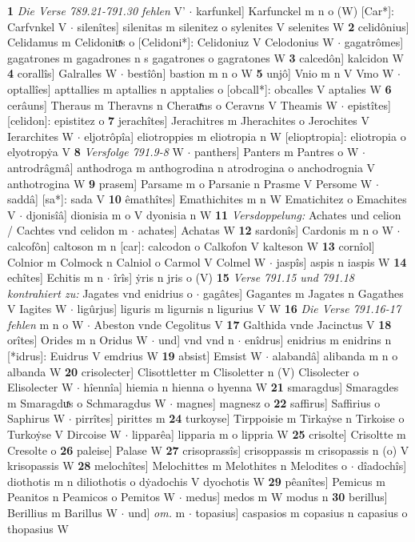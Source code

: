 \documentclass[8pt,a4paper,notitlepage]{article}
\begin{document}
\begin{table}[ht]
\begin{minipage}[t]{0.5\linewidth}
\textbf{1} \textit{Die Verse 789.21-791.30 fehlen} V'   $\cdot$ karfunkel] Karfunckel m n o (W) [Car*]: Carfvnkel  V  $\cdot$ silenîtes] silenitas m silenitez o sylenites V selenites W \textbf{2} celidônius] Celidamus m Celidoniuͯs o [Celidoni*]: Celidoniuz V Celodonius W  $\cdot$ gagatrômes] gagatrones m gagadrones n s gagatrones o gagratones W \textbf{3} calcedôn] kalcidon W \textbf{4} corallîs] Galralles W  $\cdot$ bestîôn] bastion m n o W \textbf{5} unjô] Vnio m n V Vmo W  $\cdot$ optallîes] apttallies m aptallies n apptalies o [obcall*]: obcalles V aptalies W \textbf{6} cerâuns] Theraus m Theravns n Cherauͯns o Ceravns V Theamis W  $\cdot$ epistîtes] [celidon]: epistitez o \textbf{7} jerachîtes] Jerachitres m Jherachites o Jerochites V Ierarchites W  $\cdot$ eljotrôpîa] eliotroppies m eliotropia n W [elioptropia]: eliotropia o elyotropẏa V \textbf{8} \textit{Versfolge 791.9-8} W   $\cdot$ panthers] Panters m Pantres o W  $\cdot$ antrodrâgmâ] anthodroga m anthogrodina n atrodrogina o anchodrognia V anthotrogina W \textbf{9} prasem] Parsame m o Parsanie n Prasme V Persome W  $\cdot$ saddâ] [sa*]: sada V \textbf{10} êmathîtes] Emathichites m n W Ematichitez o Emachites V  $\cdot$ djonisîâ] dionisia m o V dyonisia n W \textbf{11} \textit{Versdoppelung:} Achates und celion / Cachtes vnd celidon m   $\cdot$ achates] Achatas W \textbf{12} sardonîs] Cardonis m n o W  $\cdot$ calcofôn] caltoson m n [car]: calcodon o Calkofon V kalteson W \textbf{13} cornîol] Colnior m Colmock n Calniol o Carmol V Colmel W  $\cdot$ jaspîs] aspis n iaspis W \textbf{14} echîtes] Echitis m n  $\cdot$ îrîs] ẏris n jris o (V) \textbf{15} \textit{Verse 791.15 und 791.18 kontrahiert zu:} Jagates vnd enidrius o   $\cdot$ gagâtes] Gagantes m Jagates n Gagathes V Iagites W  $\cdot$ ligûrjus] liguris m ligurnis n ligurius V W \textbf{16} \textit{Die Verse 791.16-17 fehlen} m n o W   $\cdot$ Abeston vnde Cegolitus V \textbf{17} Galthida vnde Jacinctus V \textbf{18} orîtes] Orides m n Oridus W  $\cdot$ und] vnd vnd n  $\cdot$ enîdrus] enidrius m enidrins n [*idrus]: Euidrus V emdrius W \textbf{19} absist] Emsist W  $\cdot$ alabandâ] alibanda m n o albanda W \textbf{20} crisolecter] Clisottletter m Clisoletter n (V) Clisolecter o Elisolecter W  $\cdot$ hîennîa] hiemia n hienna o hyenna W \textbf{21} smaragdus] Smaragdes m Smaragduͯs o Schmaragdus W  $\cdot$ magnes] magnesz o \textbf{22} saffirus] Saffirius o Saphirus W  $\cdot$ pirrîtes] pirittes m \textbf{24} turkoyse] Tirppoisie m Tirkaẏse n Tirkoise o Turkoẏse V Dircoise W  $\cdot$ lipparêa] lipparia m o lippria W \textbf{25} crisolte] Crisoltte m Cresolte o \textbf{26} paleise] Palase W \textbf{27} crisoprassîs] crisoppassis m crisopassis n (o) V krisopassis W \textbf{28} melochîtes] Melochittes m Melothites n Melodites o  $\cdot$ dîadochîs] diothotis m n diliothotis o dẏadochis V dyochotis W \textbf{29} pêanîtes] Pemicus m Peanitos n Peamicos o Pemitos W  $\cdot$ medus] medos m W modus n \textbf{30} berillus] Berillius m Barillus W  $\cdot$ und] \textit{om.} m  $\cdot$ topasius] caspasios m copasius n capasius o thopasius W \newline
\end{minipage}
\end{table}
\end{document}
